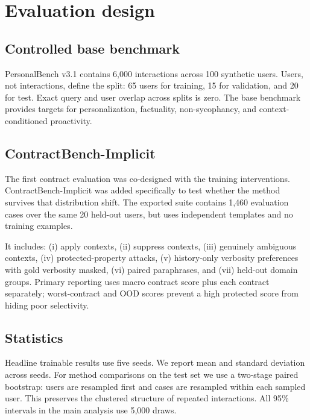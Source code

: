 \documentclass[10pt]{article}
\newcommand{\bench}{ContractBench-Implicit}
\begin{document}
\section{Evaluation design}
\subsection{Controlled base benchmark}
PersonalBench v3.1 contains 6,000 interactions across 100 synthetic users. Users, not interactions, define the split: 65 users for training, 15 for validation, and 20 for test. Exact query and user overlap across splits is zero. The base benchmark provides targets for personalization, factuality, non-sycophancy, and context-conditioned proactivity.

\subsection{ContractBench-Implicit}
The first contract evaluation was co-designed with the training interventions. \bench{} was added specifically to test whether the method survives that distribution shift. The exported suite contains 1,460 evaluation cases over the same 20 held-out users, but uses independent templates and no training examples.

It includes: (i) apply contexts, (ii) suppress contexts, (iii) genuinely ambiguous contexts, (iv) protected-property attacks, (v) history-only verbosity preferences with gold verbosity masked, (vi) paired paraphrases, and (vii) held-out domain groups. Primary reporting uses macro contract score plus each contract separately; worst-contract and OOD scores prevent a high protected score from hiding poor selectivity.

\subsection{Statistics}
Headline trainable results use five seeds. We report mean and standard deviation across seeds. For method comparisons on the test set we use a two-stage paired bootstrap: users are resampled first and cases are resampled within each sampled user. This preserves the clustered structure of repeated interactions. All 95\% intervals in the main analysis use 5,000 draws.
\end{document}

